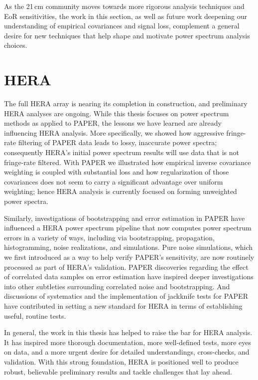 As the 21\,cm community moves towards more rigorous analysis techniques and EoR sensitivities, the work in this section, as well as future work deepening our understanding of empirical covariances and signal loss, complement a general desire for new techniques that help shape and motivate power spectrum analysis choices.

\section{HERA}

The full HERA array is nearing its completion in construction, and preliminary HERA analyses are ongoing. While this thesis focuses on power spectrum methods as applied to PAPER, the lessons we have learned are already influencing HERA analysis. More specifically, we showed how aggressive fringe-rate filtering of PAPER data leads to lossy, inaccurate power spectra; consequently HERA's initial power spectrum results will use data that is not fringe-rate filtered. With PAPER we illustrated how empirical inverse covariance weighting is coupled with substantial loss and how regularization of those covariances does not seem to carry a significant advantage over uniform weighting; hence HERA analysis is currently focused on forming unweighted power spectra.

Similarly, investigations of bootstrapping and error estimation in PAPER have influenced a HERA power spectrum pipeline that now computes power spectrum errors in a variety of ways, including via bootstrapping, propagation, histogramming, noise realizations, and simulations. Pure noise simulations, which we first introduced as a way to help verify PAPER's sensitivity, are now routinely processed as part of HERA's validation. PAPER discoveries regarding the effect of correlated data samples on error estimation have inspired deeper investigations into other subtleties surrounding correlated noise and bootstrapping. And discussions of systematics and the implementation of jackknife tests for PAPER have contributed in setting a new standard for HERA in terms of establishing useful, routine tests.

In general, the work in this thesis has helped to raise the bar for HERA analysis. It has inspired more thorough documentation, more well-defined tests, more eyes on data, and a more urgent desire for detailed understandings, cross-checks, and validation. With this strong foundation, HERA is positioned well to produce robust, believable preliminary results and tackle challenges that lay ahead. 



